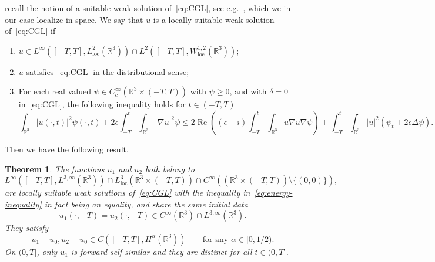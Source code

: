 \documentclass[11pt]{article}
\DeclareMathOperator{\real}{Re}
\newcommand{\conj}[1]{\overline{#1}}
\newtheorem{theorem}[definition]{Theorem}
\begin{document}
recall the notion of a suitable weak solution of~\eqref{eq:CGL}, see
e.g.~\cite{Yan1999}, which we in our case localize in space. We say
that \(u\) is a locally suitable weak solution of~\eqref{eq:CGL} if
\begin{enumerate}
\item
  \(u \in L^{\infty}([-T, T], L_{\text{loc}}^{2}(\mathbb{R}^{3})) \cap
  L^{2}([-T, T], W_{\text{loc}}^{1,2}(\mathbb{R}^{3}))\);
\item \(u\) satisfies~\eqref{eq:CGL} in the distributional sense;
\item For each real valued
  \(\psi \in C_{c}^{\infty}(\mathbb{R}^{3} \times (-T, T))\) with
  \(\psi \geq 0\), and with \(\delta = 0\) in~\eqref{eq:CGL}, the
  following inequality holds for \(t \in (-T, T)\)
  \begin{equation}\label{eq:energy-inequality}
    \int_{\mathbb{R}^{3}} |u(\cdot, t)|^{2}\psi(\cdot, t)
    + 2\epsilon \int_{-T}^{t}\int_{\mathbb{R}^{3}} |\nabla u|^{2}\psi
    \leq 2\real\left((\epsilon + i)\int_{-T}^{t}\int_{\mathbb{R}^{3}} u\nabla \conj{u}\nabla\psi\right)
    + \int_{-T}^{t}\int_{\mathbb{R}^{3}} |u|^{2}(\psi_{t} + 2\epsilon \Delta\psi).
  \end{equation}
\end{enumerate}
Then we have the following result.

\begin{theorem}\label{thm:main}
  The functions \(u_{1}\) and \(u_{2}\) both belong to
  \begin{equation*}
    L^{\infty}([-T, T], L^{3,\infty}(\mathbb{R}^{3}))
    \cap L_{\text{loc}}^{3}(\mathbb{R}^{3} \times (-T, T))
    \cap C^{\infty}((\mathbb{R}^{3} \times (-T, T)) \setminus \{(0, 0)\}),
  \end{equation*}
  are locally suitable weak solutions of~\eqref{eq:CGL} with the
  inequality in~\eqref{eq:energy-inequality} in fact being an
  equality, and share the same initial data
  \begin{equation*}
    u_{1}(\cdot, -T) = u_{2}(\cdot, -T) \in C^{\infty}(\mathbb{R}^{3}) \cap L^{3,\infty}(\mathbb{R}^{3}).
  \end{equation*}
  They satisfy
  \begin{equation*}
    u_{1} - u_{0}, u_{2} - u_{0} \in C([-T, T], H^{\alpha}(\mathbb{R}^{3}))\qquad \text{for any } \alpha \in [0, 1 / 2).
  \end{equation*}
  On \((0, T]\), only \(u_{1}\) is forward self-similar and they are
  distinct for all \(t \in (0, T]\).
\end{theorem}
\end{document}
